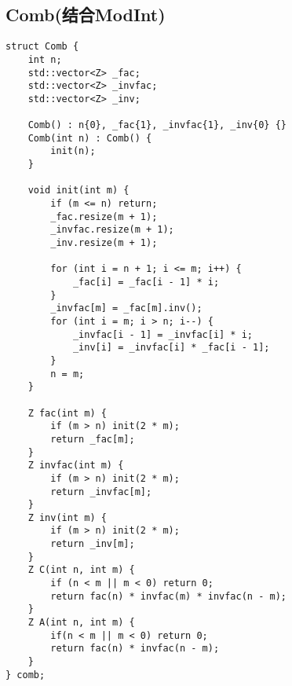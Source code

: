 \subsection{Comb(结合ModInt)}
\begin{lstlisting}
struct Comb {
    int n;
    std::vector<Z> _fac;
    std::vector<Z> _invfac;
    std::vector<Z> _inv;
    
    Comb() : n{0}, _fac{1}, _invfac{1}, _inv{0} {}
    Comb(int n) : Comb() {
        init(n);
    }
    
    void init(int m) {
        if (m <= n) return;
        _fac.resize(m + 1);
        _invfac.resize(m + 1);
        _inv.resize(m + 1);
        
        for (int i = n + 1; i <= m; i++) {
            _fac[i] = _fac[i - 1] * i;
        }
        _invfac[m] = _fac[m].inv();
        for (int i = m; i > n; i--) {
            _invfac[i - 1] = _invfac[i] * i;
            _inv[i] = _invfac[i] * _fac[i - 1];
        }
        n = m;
    }
    
    Z fac(int m) {
        if (m > n) init(2 * m);
        return _fac[m];
    }
    Z invfac(int m) {
        if (m > n) init(2 * m);
        return _invfac[m];
    }
    Z inv(int m) {
        if (m > n) init(2 * m);
        return _inv[m];
    }
    Z C(int n, int m) {
        if (n < m || m < 0) return 0;
        return fac(n) * invfac(m) * invfac(n - m);
    }
    Z A(int n, int m) {
        if(n < m || m < 0) return 0;
        return fac(n) * invfac(n - m);
    }
} comb;
\end{lstlisting}

